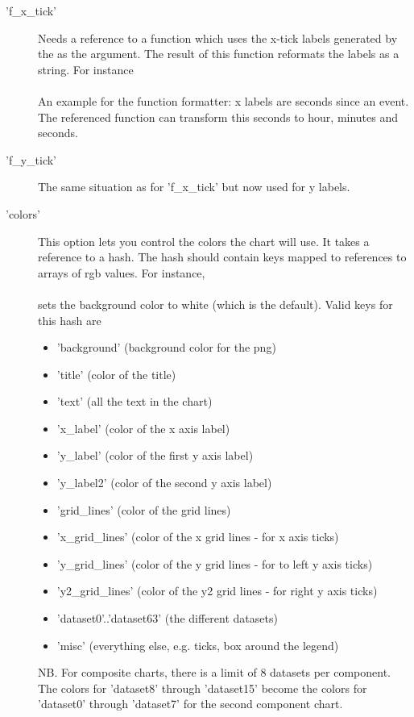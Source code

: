 \begin{description}
\item['f\_x\_tick'] Needs a reference to a function 
           which uses the x-tick labels generated by the  as the argument. 
           The result of this function reformats the labels as a string. 
           For instance\\
           \\
           An example for the function formatter: x labels are seconds since an event. 
           The referenced function can transform this seconds to hour, minutes and seconds.

\item['f\_y\_tick']The same situation as for 'f\_x\_tick' but now used for y labels.

\item['colors']This option lets you control the colors the chart will use.  
              It takes a reference to a hash.  
              The hash should contain keys mapped to references to arrays of rgb values.  
              For instance,\\
              \\
              sets the background color to white (which is the default).  
              Valid keys for this hash are
              \begin{itemize}
              \item 'background' (background color for the png)
              \item 'title' (color of the title)
              \item 'text' (all the text in the chart)
              \item 'x\_label' (color of the x axis label)
              \item 'y\_label' (color of the first y axis label)
              \item 'y\_label2' (color of the second y axis label)
              \item 'grid\_lines' (color of the grid lines)
              \item 'x\_grid\_lines' (color of the x grid lines - for x axis ticks)
              \item 'y\_grid\_lines' (color of the y grid lines - for to left y axis ticks)
              \item 'y2\_grid\_lines' (color of the y2 grid lines - for right y axis ticks)
              \item 'dataset0'..'dataset63' (the different datasets)
              \item 'misc' (everything else, e.g. ticks, box around the legend)
              \end{itemize}
             NB. For composite charts, there is a limit of 8 datasets per component. 
             The colors for 'dataset8' through 'dataset15' 
             become the colors for 'dataset0' through 'dataset7' for the second component chart.


\end{description}

